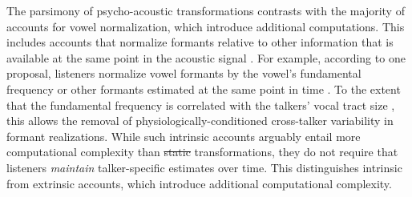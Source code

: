 \documentclass[preprint]{JASA}
\providecommand{\DIFadd}[1]{{\protect\color{blue}\uwave{#1}}} %
\providecommand{\DIFdel}[1]{{\protect\color{red}\sout{#1}}}                      %
\providecommand{\DIFaddbegin}{} %
\providecommand{\DIFaddend}{} %
\providecommand{\DIFdelbegin}{} %
\providecommand{\DIFdelend}{} %
\begin{document}
The parsimony of psycho-acoustic transformations contrasts with the majority of accounts for vowel normalization, which introduce additional computations. This includes accounts that normalize formants relative to other information that is available at the same point in the acoustic signal \citep[intrinsic normalization, e.g.,][]{miller1989, peterson1961, syrdal-gopal1986}. For example, according to one proposal, listeners normalize vowel formants by the vowel's fundamental frequency or other formants estimated at the same point in time \citep{syrdal-gopal1986}. To the extent that the fundamental frequency is correlated with the talkers' vocal tract size \citep[for review, see][]{vorperian-kent2007}, this allows the removal of physiologically-conditioned cross-talker variability in formant realizations. While such intrinsic accounts arguably entail more computational complexity than \DIFdelbegin \DIFdel{static }\DIFdelend \DIFaddbegin \DIFadd{estimation-free }\DIFaddend transformations, they do not require that listeners \emph{maintain} talker-specific estimates over time. This distinguishes intrinsic from extrinsic accounts, which introduce additional computational complexity.
\end{document}
